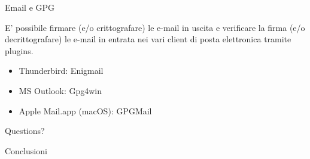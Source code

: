 \documentclass[10pt]{beamer}
\begin{document}
\begin{frame}[fragile]{Email e GPG}

E' possibile firmare (e/o crittografare) le e-mail in uscita e verificare la firma (e/o decrittografare) le e-mail in entrata nei vari client di posta elettronica tramite plugins.

\begin{itemize}
\item Thunderbird: Enigmail
\item MS Outlook: Gpg4win
\item Apple Mail.app (macOS): GPGMail
\end{itemize}

\end{frame}

\begin{frame}[standout]
  Questions?
\end{frame}

\begin{frame}{Conclusioni}

  \begin{center}\ccbysa\end{center}

\end{frame}
\end{document}
